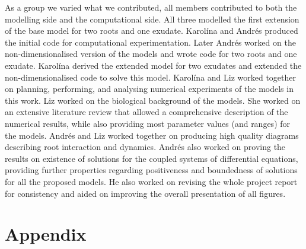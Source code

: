 \documentclass[11pt]{article}
\numberwithin{equation}{section}
\begin{document}
As a group we varied what we contributed, all members contributed to both the modelling side and the computational side. All three modelled the first extension of the base model for two roots and one exudate. Karolína and Andrés produced the initial code for computational experimentation. Later Andrés worked on the non-dimensionalised version of the models and wrote code for two roots and one exudate. Karolína derived the extended model for two exudates and extended the non-dimensionalised code to solve this model. Karolína and Liz worked together on planning, performing, and analysing numerical experiments of the models in this work. Liz worked on the biological background of the models. She worked on an extensive literature review that allowed a comprehensive description of the numerical results, while also providing most parameter values (and ranges) for the models. Andrés and Liz worked together on producing high quality diagrams describing root interaction and dynamics. Andrés also worked on proving the results on existence of solutions for the coupled systems of differential equations, providing further properties regarding positiveness and boundedness of solutions for all the proposed models. He also worked on revising the whole project report for consistency and aided on improving the overall presentation of all figures.



























% 
\printbibliography








\newpage
{}
\appendix
\section*{Appendix}
\renewcommand{\thesubsection}{\Alph{subsection}}
\end{document}
